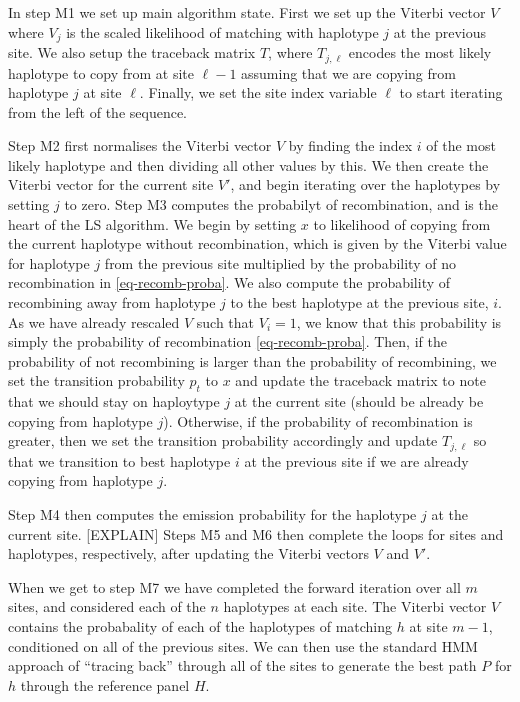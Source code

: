 \documentclass{article}
\begin{document}
In step M1 we set up main algorithm state. First we set up
the Viterbi vector $V$ where $V_j$ is the scaled likelihood of matching
with haplotype $j$ at the previous site. We also setup the traceback matrix
$T$, where $T_{j, \ell}$ encodes the most likely haplotype to copy from at site
$\ell - 1$ assuming that we are copying from haplotype $j$ at site $\ell$.
Finally, we set the site index variable $\ell$ to start iterating from the
left of the sequence.

Step M2 first normalises the Viterbi vector $V$ by finding the index $i$
of the most likely haplotype and then dividing all other values by this. We
then create the Viterbi vector for the current site $V'$, and begin
iterating over the haplotypes by setting $j$ to zero. Step M3 computes
the probabilyt of recombination, and is the heart of the LS algorithm.
We begin by setting $x$ to likelihood of copying from the current
haplotype without recombination, which is given by the Viterbi value
for haplotype $j$ from the previous site multiplied by the
probability of no recombination in \eqref{eq-recomb-proba}. We also
compute the probability of recombining away from haplotype $j$
to the best haplotype at the previous site, $i$. As we have already
rescaled $V$ such that $V_i = 1$, we know that this probability is
simply the probability of recombination \eqref{eq-recomb-proba}. Then,
if the probability of not recombining is larger than the probability
of recombining, we set the transition probability $p_t$ to $x$
and update the traceback matrix to note that we should stay on haploytype
$j$ at the current site (should be already be copying from haplotype $j$).
Otherwise, if the probability of recombination is greater, then we set the
transition probability accordingly and update $T_{j, \ell}$ so that we
transition to best haplotype $i$ at the previous site if we are already
copying from haplotype $j$.

Step M4 then computes the emission probability for the haplotype $j$
at the current site. [EXPLAIN] Steps M5 and M6 then complete the loops
for sites and haplotypes, respectively, after updating the Viterbi
vectors $V$ and $V'$.

When we get to step M7 we have completed the forward iteration over
all $m$ sites, and considered each of the $n$ haplotypes at each site.
The Viterbi vector $V$ contains the probabality of each of the haplotypes
of matching $h$ at site $m - 1$, conditioned on all of the previous sites.
We can then use the standard HMM approach of ``tracing back'' through
all of the sites to generate the best path $P$ for $h$ through the
reference panel $H$.
\end{document}
